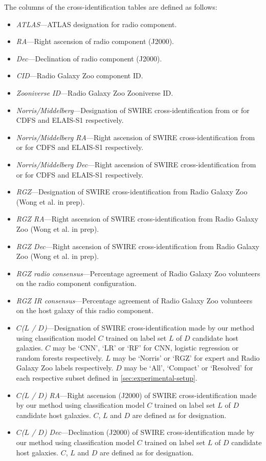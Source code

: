   The columns of the cross-identification tables are defined as follows:
  \begin{itemize}
    \item \emph{ATLAS}---ATLAS designation for radio component.
    \item \emph{RA}---Right ascension of radio component (J2000).
    \item \emph{Dec}---Declination of radio component (J2000).
    \item \emph{CID}---Radio Galaxy Zoo component ID.
    \item \emph{Zooniverse ID}---Radio Galaxy Zoo Zooniverse ID.
    \item \emph{Norris/Middelberg}---Designation of SWIRE cross-identification from \citet{norris06} or \citet{middelberg08} for CDFS and ELAIS-S1 respectively.
    \item \emph{Norris/Middelberg RA}---Right ascension of SWIRE cross-identification from \citet{norris06} or \citet{middelberg08} for CDFS and ELAIS-S1 respectively.
    \item \emph{Norris/Middelberg Dec}---Right ascension of SWIRE cross-identification from \citet{norris06} or \citet{middelberg08} for CDFS and ELAIS-S1 respectively.
    \item \emph{RGZ}---Designation of SWIRE cross-identification from Radio Galaxy Zoo (Wong et al. in prep).
    \item \emph{RGZ RA}---Right ascension of SWIRE cross-identification from Radio Galaxy Zoo (Wong et al. in prep).
    \item \emph{RGZ Dec}---Right ascension of SWIRE cross-identification from Radio Galaxy Zoo (Wong et al. in prep).
    \item \emph{RGZ radio consensus}---Percentage agreement of Radio Galaxy Zoo volunteers on the radio component configuration.
    \item \emph{RGZ IR consensus}---Percentage agreement of Radio Galaxy Zoo volunteers on the host galaxy of this radio component.
    \item \emph{$C$($L$ / $D$)}---Designation of SWIRE cross-identification made by our method using classification model $C$ trained on label set $L$ of $D$ candidate host galaxies. $C$ may be `CNN', `LR' or `RF' for CNN, logistic regression or random forests respectively. $L$ may be `Norris' or `RGZ' for expert and Radio Galaxy Zoo labels respectively. $D$ may be `All', `Compact' or `Resolved' for each respective subset defined in \autoref{sec:experimental-setup}.
    \item \emph{$C$($L$ / $D$) RA}---Right ascension (J2000) of SWIRE cross-identification made by our method using classification model $C$ trained on label set $L$ of $D$ candidate host galaxies. $C$, $L$ and $D$ are defined as for designation.
    \item \emph{$C$($L$ / $D$) Dec}---Declination (J2000) of SWIRE cross-identification made by our method using classification model $C$ trained on label set $L$ of $D$ candidate host galaxies. $C$, $L$ and $D$ are defined as for designation.
  \end{itemize}


